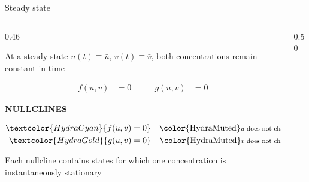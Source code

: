 \begin{frame}{Steady state}

  \vspace{-0.12cm}

  \begin{columns}[c,onlytextwidth]


    
    \begin{column}{0.46\textwidth}
            {\color{HydraMuted}\fontsize{8.1}{10.2}\selectfont
        At a steady state $u(t)\equiv\bar u$, $v(t)\equiv\bar v$, both concentrations remain constant in time
      \par}


      {\color{HydraWhite}\fontsize{11.2}{14.2}\selectfont
      \[
        \begin{aligned}
          f(\bar u,\bar v)&=0
          &\qquad
          g(\bar u,\bar v)&=0
        \end{aligned}
      \]
      }

      \vspace{-0.22cm}


      \vspace{0.34cm}

      {\color{HydraWhite}\bfseries\fontsize{8}{9.6}\selectfont
        NULLCLINES\par}

      \vspace{-0.10cm}

      {\color{HydraWhite}\fontsize{11}{14}\selectfont
      \begin{align*}
        \textcolor{HydraCyan}{f(u,v)=0}
        &&
        \text{\color{HydraMuted}\fontsize{7.6}{9}\selectfont
          $u$ does not change}
        \\
        \textcolor{HydraGold}{g(u,v)=0}
        &&
        \text{\color{HydraMuted}\fontsize{7.6}{9}\selectfont
          $v$ does not change}
      \end{align*}
      }

      \vspace{-0.12cm}

      {\color{HydraMuted}\fontsize{8.1}{10.2}\selectfont
        Each nullcline contains states for which one concentration
        is instantaneously stationary
      \par}


    \end{column}

    \begin{column}{0.50\textwidth}
      \centering


\end{column}
\end{columns}
\end{frame}
